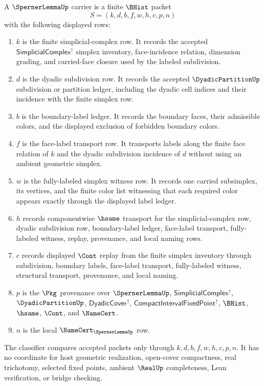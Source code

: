 \begin{definition}
\label{def:sperner-lemma-carrier}
A $\SpernerLemmaUp$ carrier is a finite $\BHist$ packet
$$
S=(k,d,b,f,w,h,c,p,n)
$$
with the following displayed rows:
\begin{enumerate}
\item $k$ is the finite simplicial-complex row. It records the accepted $\mathsf{SimplicialComplex}^{\uparrow}$ simplex inventory, face-incidence relation, dimension grading, and carried-face closure used by the labeled subdivision.
\item $d$ is the dyadic subdivision row. It records the accepted $\DyadicPartitionUp$ subdivision or partition ledger, including the dyadic cell indices and their incidence with the finite simplex row.
\item $b$ is the boundary-label ledger. It records the boundary faces, their admissible colors, and the displayed exclusion of forbidden boundary colors.
\item $f$ is the face-label transport row. It transports labels along the finite face relation of $k$ and the dyadic subdivision incidence of $d$ without using an ambient geometric simplex.
\item $w$ is the fully-labeled simplex witness row. It records one carried subsimplex, its vertices, and the finite color list witnessing that each required color appears exactly through the displayed label ledger.
\item $h$ records componentwise $\hsame$ transport for the simplicial-complex row, dyadic subdivision row, boundary-label ledger, face-label transport, fully-labeled witness, replay, provenance, and local naming rows.
\item $c$ records displayed $\Cont$ replay from the finite simplex inventory through subdivision, boundary labels, face-label transport, fully-labeled witness, structural transport, provenance, and local naming.
\item $p$ is the $\Pkg$ provenance over $\SpernerLemmaUp$, $\mathsf{SimplicialComplex}^{\uparrow}$, $\DyadicPartitionUp$, $\mathsf{DyadicCover}^{\uparrow}$, $\mathsf{CompactIntervalFixedPoint}^{\uparrow}$, $\BHist$, $\hsame$, $\Cont$, and $\NameCert$.
\item $n$ is the local $\NameCert_{\SpernerLemmaUp}$ row.
\end{enumerate}
The classifier compares accepted packets only through $k,d,b,f,w,h,c,p,n$. It has no coordinate for host geometric realization, open-cover compactness, real trichotomy, selected fixed points, ambient $\RealUp$ completeness, Lean verification, or bridge checking.
\end{definition}

